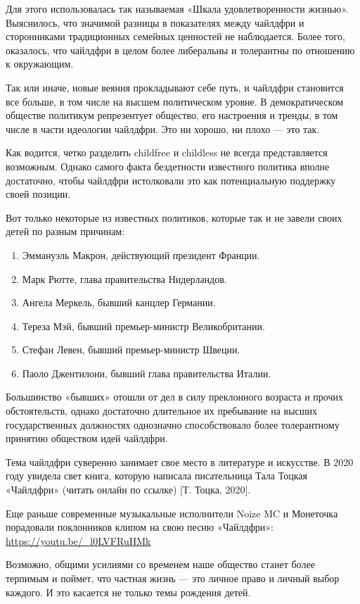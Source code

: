 Для этого использовалась так называемая «Шкала удовлетворенности жизнью». Выяснилось, что значимой разницы в показателях между чайлдфри и сторонниками традиционных семейных ценностей не наблюдается. Более того, оказалось, что чайлдфри в целом более либеральны и толерантны по отношению к окружающим.

Так или иначе, новые веяния прокладывают себе путь, и чайлдфри становится все больше, в том числе на высшем политическом уровне. В демократическом обществе политикум репрезентует общество, его настроения и тренды, в том числе в части идеологии чайлдфри. Это ни хорошо, ни плохо --- это так.

Как водится, четко разделить childfree и childless не всегда представляется возможным. Однако самого факта бездетности известного политика вполне достаточно, чтобы чайлдфри истолковали это как потенциальную поддержку своей позиции.

Вот только некоторые из известных политиков, которые так и не завели своих детей по разным причинам:
\begin{enumerate}
    \item Эммануэль Макрон, действующий президент Франции.
    \item Марк Рютте, глава правительства Нидерландов.
    \item Ангела Меркель, бывший канцлер Германии.
    \item Тереза Мэй, бывший премьер-министр Великобритании.
    \item Стефан Левен, бывший премьер-министр Швеции.
    \item Паоло Джентилони, бывший глава правительства Италии.
\end{enumerate}

Большинство «бывших» отошли от дел в силу преклонного возраста и прочих обстоятельств, однако достаточно длительное их пребывание на высших государственных должностях однозначно способствовало более толерантному принятию обществом идей чайлдфри.

Тема чайлдфри суверенно занимает свое место в литературе и искусстве. В 2020 году увидела свет книга, которую написала писательница Тала Тоцкая «Чайлдфри» (читать онлайн по ссылке) [Т. Тоцка, 2020].

Еще раньше современные музыкальные исполнители Noize MC и Монеточка порадовали поклонников клипом на свою песню «Чайлдфри»: \url{https://youtu.be/_l0LVFRuHMk}

Возможно, общими усилиями со временем наше общество станет более терпимым и поймет, что частная жизнь --- это личное право и личный выбор каждого. И это касается не только темы рождения детей.

